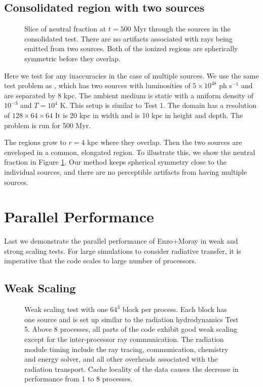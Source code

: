 \documentclass[useAMS,usenatbib,a4paper]{mn2e}
\begin{document}
\subsection{Consolidated \hii region with two sources}

\begin{figure}
  \caption{\label{fig:twosrc} Slice of neutral fraction at $t = 500$
    Myr through the sources in the consolidated \hii test.
    There are no artifacts associated with rays being emitted from two
    sources.  Both of the ionized regions are spherically symmetric
    before they overlap.}
\end{figure}

Here we test for any inaccuracies in the case of multiple sources.  We
use the same test problem as \citet[][\S5.1.2]{Petkova09}, which has
two sources with luminosities of $5 \times 10^{48}$ ph s$^{-1}$ and
are separated by 8 kpc.  The ambient medium is static with a uniform
density of $10^{-3}$ \cubecm and $T = 10^4$ K.  This setup is similar
to Test 1.  The domain has a resolution of $128 \times 64 \times 64$
It is 20 kpc in width and is 10 kpc in height and depth.  The problem
is run for 500 Myr.

The \hii regions grow to $r = 4$ kpc where they overlap.  Then
the two sources are enveloped in a common, elongated \hii
region.  To illustrate this, we show the neutral fraction in Figure
\ref{fig:twosrc}.  Our method keeps spherical symmetry close to the
individual sources, and there are no perceptible artifacts from having
multiple sources.

\section{Parallel Performance}

Last we demonstrate the parallel performance of Enzo+Moray in weak and
strong scaling tests.  For large simulations to consider radiative
transfer, it is imperative that the code scales to large number of
processors.

\subsection{Weak Scaling}
\label{sec:weak_sc}

\begin{figure}
  \caption{\label{fig:weak} Weak scaling test with one $64^3$ block
    per process.  Each block has one source and is set up similar to
    the radiation hydrodynamics Test 5.  Above 8 processes, all parts
    of the code exhibit good weak scaling except for the
    inter-processor ray communication.  The radiation module timing
    include the ray tracing, communication, chemistry and energy
    solver, and all other overheads associated with the radiation
    transport.  Cache locality of the data causes the decrease in
    performance from 1 to 8 processes.}
\end{figure}
\end{document}
